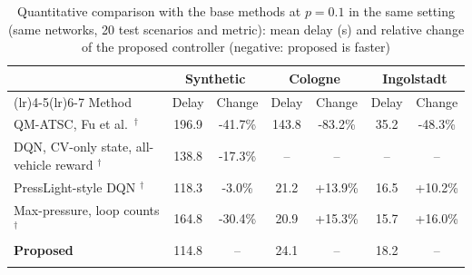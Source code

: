 \begin{table}[t]
\caption{Quantitative comparison with the base methods at $p=0.1$ in the same setting (same networks, 20 test scenarios and metric): mean delay (s) and relative change of the proposed controller (negative: proposed is faster)}
\label{tab:basecmp}
\scriptsize
\setlength{\tabcolsep}{2.4pt}
\begin{tabular*}{\textwidth}{@{\extracolsep\fill}>{\raggedright\arraybackslash}p{4.6cm}cccccc@{}}
\toprule
 & \multicolumn{2}{c}{Synthetic} & \multicolumn{2}{c}{Cologne} & \multicolumn{2}{c}{Ingolstadt}\\
\cmidrule(lr){2-3}\cmidrule(lr){4-5}\cmidrule(lr){6-7}
Method & Delay & Change & Delay & Change & Delay & Change\\
\midrule
QM-ATSC, Fu et al.\ \citep{fu2026}$^\dagger$ & 196.9 & -41.7\% & 143.8 & -83.2\% & 35.2 & -48.3\%\\
DQN, CV-only state, all-vehicle reward \citep{ducrocq2023}$^\dagger$ & 138.8 & -17.3\% & -- & -- & -- & --\\
PressLight-style DQN \citep{wei2019}$^\dagger$ & 118.3 & -3.0\% & 21.2 & +13.9\% & 16.5 & +10.2\%\\
Max-pressure, loop counts \citep{varaiya2013}$^\dagger$ & 164.8 & -30.4\% & 20.9 & +15.3\% & 15.7 & +16.0\%\\
\textbf{Proposed} & 114.8 & -- & 24.1 & -- & 18.2 & --\\
\botrule
\end{tabular*}
\end{table}
